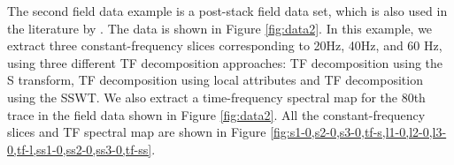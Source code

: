 

The second field data example is a post-stack field data set, which is also used in the literature by \cite{guochang20112}. The data is shown in Figure \ref{fig:data2}. In this example, we extract three constant-frequency slices corresponding to 20Hz, 40Hz, and 60 Hz, using three different TF decomposition approaches: TF decomposition using the S transform, TF decomposition using local attributes and TF decomposition using the SSWT. We also extract a time-frequency spectral map for the 80th trace in the field data shown in Figure \ref{fig:data2}. All the constant-frequency slices and TF spectral map are shown in Figure \ref{fig:s1-0,s2-0,s3-0,tf-s,l1-0,l2-0,l3-0,tf-l,ss1-0,ss2-0,ss3-0,tf-ss}.




